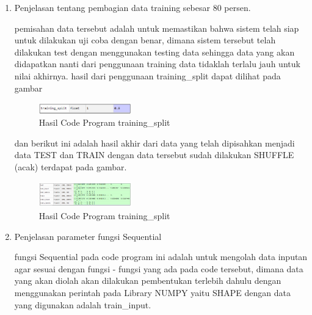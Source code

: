 \begin{enumerate}
            \item Penjelasan tentang pembagian data training sebesar 80 persen.
            
            
            
            \subitem pemisahan data tersebut adalah untuk memastikan bahwa sistem telah siap untuk dilakukan uji coba dengan benar, dimana sistem tersebut telah dilakukan test dengan menggunakan testing data sehingga data yang akan didapatkan nanti dari penggunaan training data tidaklah terlalu jauh untuk nilai akhirnya. hasil dari penggunaan training\_split dapat dilihat pada gambar 
            
            \begin{figure}[H]
                \includegraphics[width=4cm]{figures/1174040/chapter6/4.png}
                \centering
                  \caption{Hasil Code Program training\_split}
            \end{figure}
            
            \subitem dan berikut ini adalah hasil akhir dari data yang telah dipisahkan menjadi data TEST dan TRAIN dengan data tersebut sudah dilakukan SHUFFLE (acak) terdapat pada gambar.
            
            \begin{figure}[H]
                \includegraphics[width=4cm]{figures/1174040/chapter6/5.png}
                \centering
                  \caption{Hasil Code Program training\_split}
            \end{figure}
            
            \item Penjelasan parameter fungsi Sequential
            
            
            
            \subitem fungsi Sequential pada code program ini adalah untuk mengolah data inputan agar sesuai dengan fungsi - fungsi yang ada pada code tersebut, dimana data yang akan diolah akan dilakukan pembentukan terlebih dahulu dengan menggunakan perintah pada Library NUMPY yaitu SHAPE dengan data yang digunakan adalah train\_input.
            

\end{enumerate}

